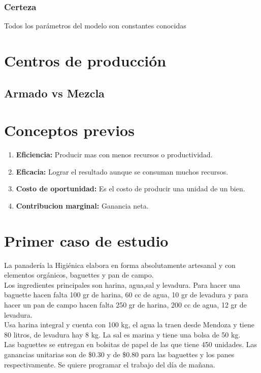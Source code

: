 \documentclass[12pt]{book}
\begin{document}
\subsubsection{Certeza}Todos los parámetros del modelo son constantes conocidas

\section{Centros de producción}
\subsection{Armado vs Mezcla}

\section{Conceptos previos}
\begin{enumerate}
	\item \textbf{Eficiencia:} Producir mas con menos recursos o productividad.
	\item \textbf{Eficacia:} Lograr el resultado aunque se consuman muchos recursos.
	\item \textbf{Costo de oportunidad:} Es el costo de producir una unidad de un bien.
	\item \textbf{Contribucion marginal:} Ganancia neta.
\end{enumerate}

\section{Primer caso de estudio}

La panadería la Higiénica elabora en forma absolutamente artesanal y con elementos orgánicos, baguettes y pan de campo.\\
Los ingredientes principales son harina, agua,sal y levadura. Para hacer una baguette hacen falta 100 gr de harina, 60 cc de agua, 10 gr de levadura y para hacer un pan de campo hacen falta 250 gr de harina, 200 cc de agua, 12 gr de levadura. \\
Usa harina integral y cuenta con 100 kg, el agua la traen desde Mendoza y tiene 80 litros, de levadura hay 8 kg. La sal es marina y tiene una bolsa de 50 kg. \\
Las baguettes se entregan en bolsitas de papel de las que tiene 450 unidades.
Las ganancias unitarias son de \$0.30  y de \$0.80  para las baguettes y los panes respectivamente.
Se quiere programar el trabajo del día de mañana.
\end{document}
